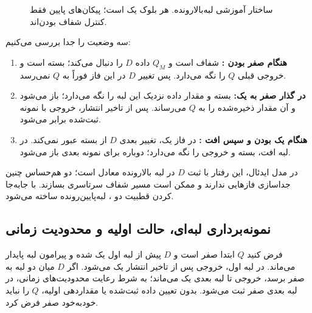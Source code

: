 \begin{figure}[ht]
\centering
\begin{latin}
\end{latin}
\caption{ساختار آموزشی  لبه‌بالارونده.
هر بلوک یک  است؛ پیکان‌های پایین فقط کنترل شفاف بودن‌اند.}
\label{fig:ch1-flop}
\end{figure}

سه وضعیت را جدا بررسی می‌کنیم:
\begin{enumerate}
\item \textbf{هنگام صفر بودن :}
 شفاف است و \(Q_M\) داده \(D\) را دنبال می‌کند؛
 بسته است و خروجی قبلی \(Q\) را نگه می‌دارد.
پس تغییر \(D\) در این فاز فوراً به \(Q\) نمی‌رسد.
\item \textbf{در گذار صفر به یک:}
 بسته و مقدار داده نزدیک این لبه را نگه می‌دارد؛
 باز می‌شود و آن مقدار ذخیره‌شده را به \(Q\) می‌رساند.
پس از تاخیر انتشار، خروجی با نمونه ثبت‌شده برابر می‌شود.
\item \textbf{هنگام یک بودن و سپس افت :}
در فاز یک، تغییر بعدی \(D\) از  بسته عبور نمی‌کند.
در لبه افت،  بسته و خروجی را نگه می‌دارد؛
 دوباره برای نمونه بعدی باز می‌شود.
\end{enumerate}
در مدل ایدئال، این رفتار با ثبت \(D\) در لبه بالارونده معادل است؛
دو  هم‌حساس چنین جداسازی فازهایی ندارند و ممکن است مسیر شفاف سرتاسری بسازند.
با جابه‌جا کردن قطبیت دو ،  لبه‌پایین‌رونده ساخته می‌شود.

\subsection{نمونه‌برداری لبه‌ای، حالت اولیه و محدودیت زمانی}
فرض کنید \(Q\) ابتدا صفر است و \(D\) پیش از لبه اول یک شده و پیرامون لبه
پایدار می‌ماند. در لبه اول، خروجی پس از تاخیر انتشار یک می‌شود.
اگر \(D\) میان دو لبه به صفر برسد، خروجی تا لبه بعدی یک می‌ماند؛
به شرط رعایت محدودیت‌های زمانی، در لبه بعدی صفر ثبت می‌شود.
بدون تعیین داده ثبت‌شده یا مقداردهی اولیه، \(Q\) را نباید خودبه‌خود صفر فرض کرد.

